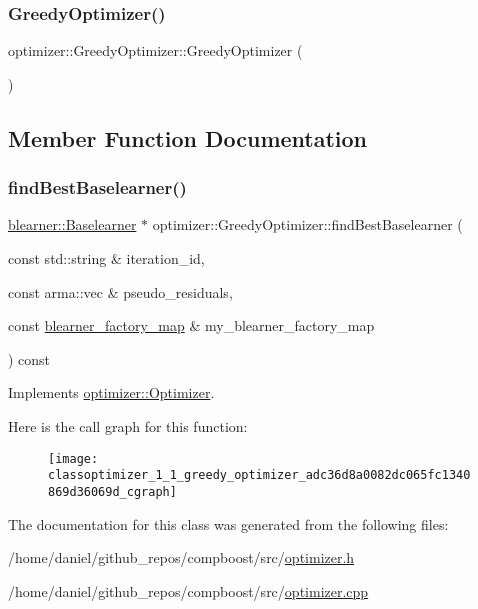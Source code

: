 \subsubsection{\texorpdfstring{Greedy\+Optimizer()}{CoordinateDescent()}}
{\footnotesize\ttfamily optimizer\+::\+Greedy\+Optimizer\+::\+Greedy\+Optimizer (\begin{DoxyParamCaption}{ }\end{DoxyParamCaption})}



\subsection{Member Function Documentation}
\mbox{\label{classoptimizer_1_1_greedy_optimizer_adc36d8a0082dc065fc1340869d36069d}} 
\subsubsection{\texorpdfstring{find\+Best\+Baselearner()}{findBestBaselearner()}}
{\footnotesize\ttfamily \hyperlink{classblearner_1_1_baselearner}{blearner\+::\+Baselearner} $\ast$ optimizer\+::\+Greedy\+Optimizer\+::find\+Best\+Baselearner (\begin{DoxyParamCaption}\item[{const std\+::string \&}]{iteration\+\_\+id,  }\item[{const arma\+::vec \&}]{pseudo\+\_\+residuals,  }\item[{const \hyperlink{baselearner__factory__list_8h_a058570e00ae11b882cfed36eb40be025}{blearner\+\_\+factory\+\_\+map} \&}]{my\+\_\+blearner\+\_\+factory\+\_\+map }\end{DoxyParamCaption}) const\hspace{0.3cm}{\ttfamily [virtual]}}



Implements \hyperlink{classoptimizer_1_1_optimizer_a134c7b34ed868231fbab53e9ebfa8fd8}{optimizer\+::\+Optimizer}.

Here is the call graph for this function\+:\nopagebreak
\begin{figure}[H]
\begin{center}
\leavevmode
\texttt{[image: classoptimizer\_1\_1\_greedy\_optimizer\_adc36d8a0082dc065fc1340869d36069d\_cgraph]}
\end{center}
\end{figure}


The documentation for this class was generated from the following files\+:\begin{DoxyCompactItemize}
\item 
/home/daniel/github\+\_\+repos/compboost/src/\hyperlink{optimizer_8h}{optimizer.\+h}\item 
/home/daniel/github\+\_\+repos/compboost/src/\hyperlink{optimizer_8cpp}{optimizer.\+cpp}\end{DoxyCompactItemize}
